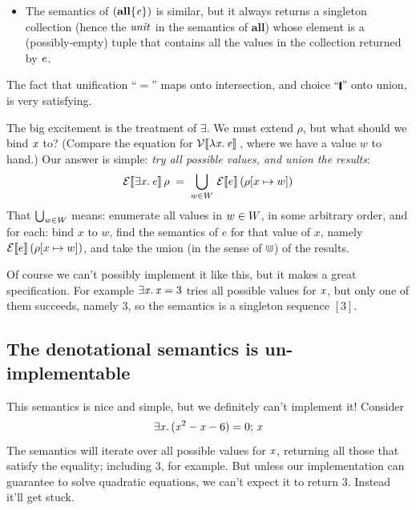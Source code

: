 \begin{itemize}
  collection of values returned by \ensuremath{\Varid{e}}.  If \ensuremath{\Varid{e}} returns no values, so does \ensuremath{(\textbf{one}\{\Varid{e}\})}; but if \ensuremath{\Varid{e}} returns one or more values,
  \ensuremath{(\textbf{one}\{\Varid{e}\})} returns the first.  Of course that begs the question of what ``the first'' means -- for bags
  it would be non-deterministic. We will fix this problem in , but for now we simply ignore it.
\item The semantics of \ensuremath{(\textbf{all}\{\Varid{e}\})} is similar, but it always returns a singleton collection
  (hence the $\mathit{unit}$ in the semantics of \ensuremath{\textbf{all}}) whose
  element is a (possibly-empty) tuple that contains all the values in the collection returned by \ensuremath{\Varid{e}}.
\end{itemize}
The fact that unification ``\ensuremath{\mathrel{=}}'' maps onto intersection, and choice ``\ensuremath{\rule[-0.1em]{0.15em}{0.75em}}'' onto union, is
very satisfying.

The big excitement is the treatment of \ensuremath{\exists{}}. We must extend $\rho$, but what should we bind \ensuremath{\Varid{x}} to?  (Compare the
equation for $\mathcal{V}\llbracket \lambda\mathit{x}.\,\mathit{e} \rrbracket\,$, where we have a value $w$ to hand.)
Our answer is simple: \emph{try all possible values, and union the results}:
$$
\mathcal{E}\llbracket \exists\mathit{x}.\,\mathit{e} \rrbracket\, \rho \; = \; \bigcup_{w \in W}\, \mathcal{E}\llbracket e \rrbracket\, (\rho[x \mapsto w])
$$
That $\bigcup_{w \in W}$ means: enumerate all values in $w \in W$, in some arbitrary order,
and for each: bind $x$ to $w$, find the semantics of $e$ for that value of $x$, namely
$\mathcal{E}\llbracket e \rrbracket\, (\rho[x \mapsto w])$, and take the union
(in the sense of $\Cup$) of the results.

Of course we can't possibly implement it like this, but it makes a great specification.
For example \ensuremath{\exists\Varid{x}.\,\Varid{x}\mathrel{=}\mathrm{3}} tries all possible values for \ensuremath{\Varid{x}}, but only one of them succeeds, namely \ensuremath{\mathrm{3}}, so
the semantics is a singleton sequence $[3]$.

\subsection{The denotational semantics is un-implementable}

This semantics is nice and simple, but we definitely can't implement it!  Consider
$$
\exists\mathit{x}.\,(\mathit{x}^2\mathbin{-}\mathit{x}\mathbin{-}\mathrm{6})\mathrel{=}\mathrm{0};\,\mathit{x}
$$
The semantics will iterate over all possible values for \ensuremath{\Varid{x}}, returning all those that satisfy the equality;
including $3$, for example. But unless our implementation can guarantee to solve quadratic equations,
we can't expect it to return 3.  Instead it'll get stuck.

